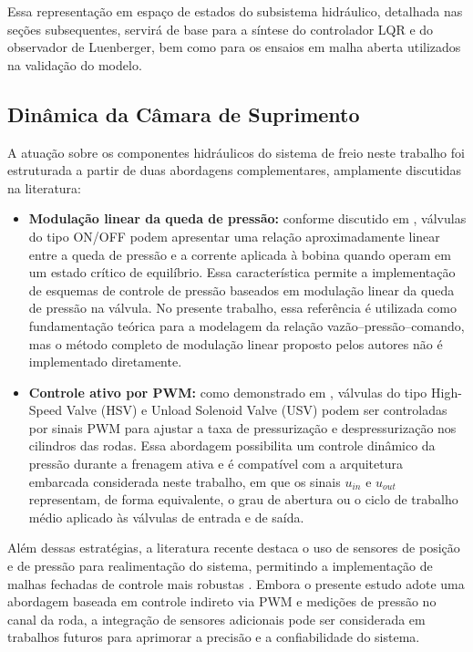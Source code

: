 Essa representação em espaço de estados do subsistema hidráulico, detalhada nas seções subsequentes, servirá de base para a síntese do controlador LQR e do observador de Luenberger, bem como para os ensaios em malha aberta utilizados na validação do modelo.

\subsection{Dinâmica da Câmara de Suprimento}
\label{sec:controle-4-1-1}

A atuação sobre os componentes hidráulicos do sistema de freio neste trabalho foi estruturada a partir de duas abordagens complementares, amplamente discutidas na literatura:

\begin{itemize}
    \item \textbf{Modulação linear da queda de pressão:} conforme discutido em , válvulas do tipo ON/OFF podem apresentar uma relação aproximadamente linear entre a queda de pressão e a corrente aplicada à bobina quando operam em um estado crítico de equilíbrio. Essa característica permite a implementação de esquemas de controle de pressão baseados em modulação linear da queda de pressão na válvula. No presente trabalho, essa referência é utilizada como fundamentação teórica para a modelagem da relação vazão–pressão–comando, mas o método completo de modulação linear proposto pelos autores não é implementado diretamente.

    \item \textbf{Controle ativo por PWM:} como demonstrado em , válvulas do tipo High-Speed Valve (HSV) e Unload Solenoid Valve (USV) podem ser controladas por sinais PWM para ajustar a taxa de pressurização e despressurização nos cilindros das rodas. Essa abordagem possibilita um controle dinâmico da pressão durante a frenagem ativa e é compatível com a arquitetura embarcada considerada neste trabalho, em que os sinais $u_{in}$ e $u_{out}$ representam, de forma equivalente, o grau de abertura ou o ciclo de trabalho médio aplicado às válvulas de entrada e de saída.
\end{itemize}

Além dessas estratégias, a literatura recente destaca o uso de sensores de posição e de pressão para realimentação do sistema, permitindo a implementação de malhas fechadas de controle mais robustas \cite{HouhuaJingShihao2023}. Embora o presente estudo adote uma abordagem baseada em controle indireto via PWM e medições de pressão no canal da roda, a integração de sensores adicionais pode ser considerada em trabalhos futuros para aprimorar a precisão e a confiabilidade do sistema.

